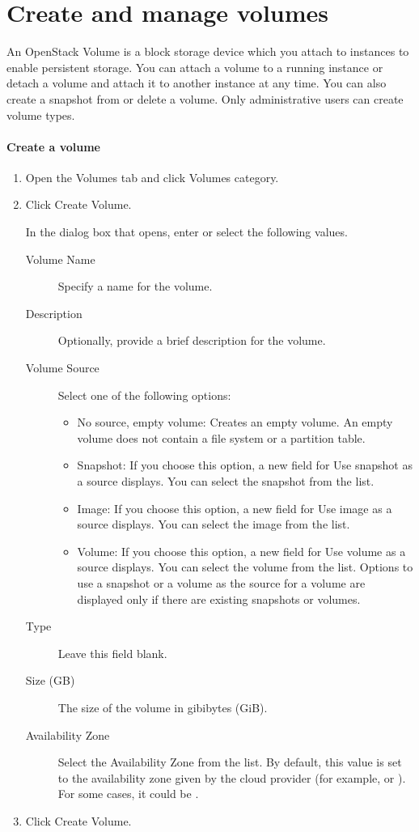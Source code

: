 \chapter{Create and manage volumes}
An \gls{OpenStack Volume} is a block storage device which you attach
to instances to enable persistent storage. You can attach a volume to
a running instance or detach a volume and attach it to another
instance at any time. You can also create a snapshot from or delete a
volume. Only administrative users can create volume types.

\subsubsection{Create a volume}\label{create-a-volume}
\begin{enumerate}
\item Open the Volumes tab and click Volumes category.
\item Click Create Volume.

  In the dialog box that opens, enter or select the following values.

  \begin{description}
  \item[Volume Name] Specify a name for the volume.
  \item[Description] Optionally, provide a brief description for the volume.
  \item[Volume Source] Select one of the following options:

    \begin{itemize}
    \item No source, empty volume: Creates an empty volume. An empty
      volume does not contain a file system or a partition table.
    \item Snapshot: If you choose this option, a new field for Use
      snapshot as a source displays. You can select the snapshot from
      the list.
    \item Image: If you choose this option, a new field for Use image
      as a source displays. You can select the image from the list.
    \item Volume: If you choose this option, a new field for Use
      volume as a source displays. You can select the volume from the
      list. Options to use a snapshot or a volume as the source for a
      volume are displayed only if there are existing snapshots or
      volumes.
    \end{itemize}
  \item[Type] Leave this field blank.
  \item[Size (GB)] The size of the volume in gibibytes (GiB).
  \item[Availability Zone] Select the Availability Zone from the
    list. By default, this value is set to the availability zone given
    by the cloud provider (for example,  or
    ). For some cases, it could be .
  \end{description}
\item Click Create Volume.
\end{enumerate}

